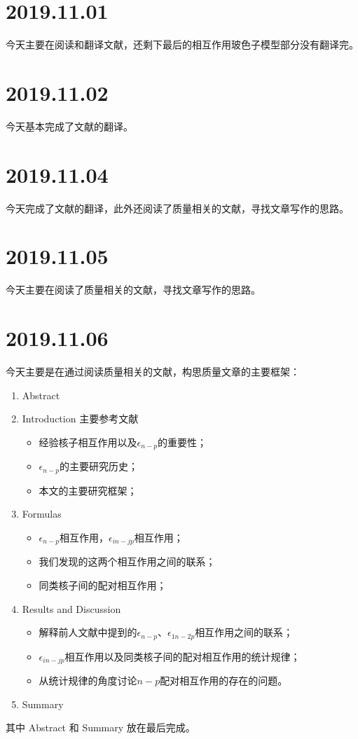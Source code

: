 \section{2019.11.01}
今天主要在阅读和翻译文献\cite{RN1176}，还剩下最后的相互作用玻色子模型部分没有翻译完。

\section{2019.11.02}
今天基本完成了文献\cite{RN1176}的翻译。

\section{2019.11.04}
今天完成了文献\cite{RN1176}的翻译，此外还阅读了质量相关的文献，寻找文章写作的思路。

\section{2019.11.05}
今天主要在阅读了质量相关的文献，寻找文章写作的思路。

\section{2019.11.06}
今天主要是在通过阅读质量相关的文献，构思质量文章的主要框架：
\begin{enumerate}
\item Abstract
\item Introduction 主要参考文献\cite{RN560,RN1176,RN544,RN565,RN545,RN568,RN561,RN567,RN1178,RN566,RN573,RN543,RN562}
\begin{itemize}
	\item 经验核子相互作用以及$\epsilon_{n-p}$的重要性；
	\item $\epsilon_{n-p}$的主要研究历史；
	\item 本文的主要研究框架；
\end{itemize}
\item Formulas
\begin{itemize}
	\item $\epsilon_{n-p}$相互作用\cite{RN565,RN1178}，$\epsilon_{in-jp}$相互作用\cite{RN543}；
	\item 我们发现的这两个相互作用之间的联系；
	\item 同类核子间的配对相互作用\cite{RN562}；
\end{itemize}
\item Results and Discussion
\begin{itemize}
	\item 解释前人文献中提到的$\epsilon_{n-p}$、$\epsilon_{1n-2p}$相互作用之间的联系\cite{RN544,RN543}；
	\item $\epsilon_{in-jp}$相互作用以及同类核子间的配对相互作用的统计规律；
	\item 从统计规律的角度讨论$n-p$配对相互作用的存在的问题\cite{RN560}。
\end{itemize}
\item Summary
\end{enumerate}
其中 Abstract 和 Summary 放在最后完成。

